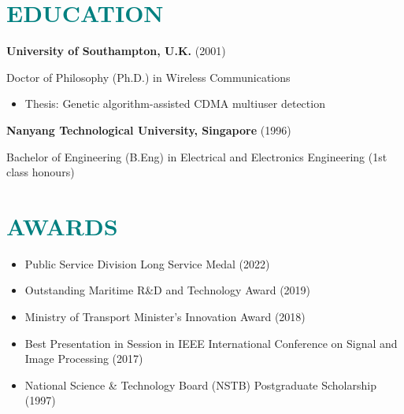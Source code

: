 \documentclass[a4paper, 11pt]{article}
\begin{document}
		
\section{\textcolor{teal}{\bf{EDUCATION}}}

	\vspace{3pt}
	
	{\bf University of Southampton, U.K.} (2001)
	
	{\raggedleft Doctor of Philosophy (Ph.D.) in Wireless Communications}
	
	\vspace{-10pt}
	
	\begin{itemize}[leftmargin=*, itemsep=-1mm]
		
		\item Thesis: Genetic algorithm-assisted CDMA multiuser detection
		
	\end{itemize}
	
	\vspace{3pt}
	
	{\raggedleft \bf Nanyang Technological University, Singapore} (1996)
	
	{\raggedleft Bachelor of Engineering (B.Eng) in Electrical and Electronics Engineering (1st class honours)}
	

\section{\textcolor{teal}{\bf{AWARDS}}}

	\vspace{3pt}
	
	\begin{itemize}[leftmargin=*, itemsep=-1mm]
		
		\item Public Service Division Long Service Medal (2022)
		
		\item Outstanding Maritime R\&D and Technology Award (2019)
		
		\item Ministry of Transport Minister’s Innovation Award (2018)
		
		\item Best Presentation in Session in IEEE International Conference on Signal and Image Processing (2017)
		
		\item National Science \& Technology Board (NSTB) Postgraduate Scholarship (1997)
		
	\end{itemize}
	
\end{document}

